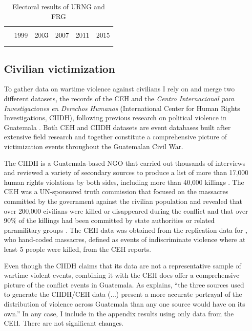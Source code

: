 \documentclass[12pt, notitlepage]{article}
\begin{document}
\vspace{15pt}
\begin{table}[!htbp] \centering
  \caption{Electoral results of URNG and FRG}\label{tab:elec_results}
  \small

  \begin{tabular}{lccccc}
  \\[-1.8ex]\hline
  \hline \\[-1.8ex]
    & 1999 & 2003 & 2007 & 2011 & 2015 \\
  \hline \\[-1.8ex]
  
  \hline
  \hline \\[-1.8ex]
  \end{tabular}

\end{table}

\subsection*{Civilian victimization}

To gather data on wartime violence against civilians I rely on and merge two different datasets, the records of the CEH and the \textit{Centro Internacional para Investigaciones en Derechos Humanos} (International Center for Human Rights Investigations, CIIDH), following previous research on political violence in Guatemala \citep{Chamarbagwala:2011aa, Sullivan:2012aa}.
Both CEH and CIIDH datasets are event databases built after extensive field research and together constitute a comprehensive picture of victimization events throughout the Guatemalan Civil War.

The CIIDH is a Guatemala-based NGO that carried out thousands of interviews and reviewed a variety of secondary sources to produce a list of more than 17,000 human rights violations by both sides, including more than 40,000 killings \citep{Ball:1999aa}.
The CEH was a UN-sponsored truth commission that focused on the massacres committed by the government against the civilian population and revealed that over 200,000 civilians were killed or disappeared during the conflict and that over 90\% of the killings had been committed by state authorities or related paramilitary groups \citep{CEH:1999aa}.
The CEH data was obtained from the replication data for \citet{Sullivan:2012aa}, who hand-coded massacres, defined as events of indiscriminate violence where at least 5 people were killed, from the CEH reports.

Even though the CIIDH claims that its data are not a representative sample of wartime violent events, combining it with the CEH does offer a comprehensive picture of the conflict events in Guatemala.
As \citet[382]{Sullivan:2012aa} explains, ``the three sources used to generate the CIIDH/CEH data (...) present a more accurate portrayal of the distribution of violence across Guatemala than any one source would have on its own.''
In any case, I include in the appendix results using only data from the CEH.
There are not significant changes.
\end{document}
